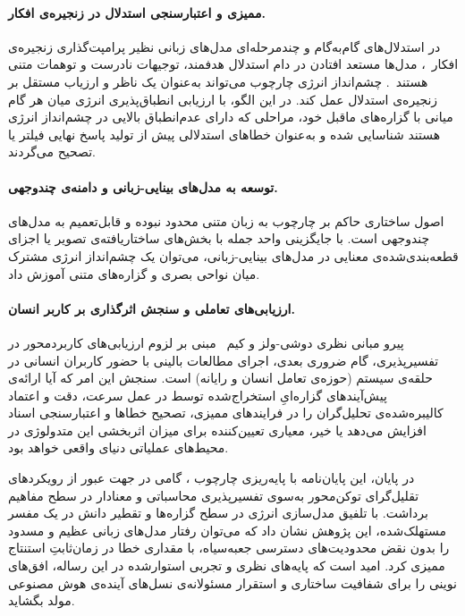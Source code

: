 \paragraph{ممیزی و اعتبارسنجی استدلال در زنجیره‌ی افکار.}
در استدلال‌های گام‌به‌گام و چندمرحله‌ای مدل‌های زبانی نظیر پرامپت‌گذاری زنجیره‌ی افکار~\cite{wei2022chain}، مدل‌ها مستعد افتادن در دام استدلال هدفمند، توجیهات نادرست و توهمات متنی هستند~\cite{turpin2023language}. چشم‌انداز انرژی چارچوب  می‌تواند به‌عنوان یک ناظر و ارزیاب مستقل بر زنجیره‌ی استدلال عمل کند. در این الگو، با ارزیابی انطباق‌پذیری انرژی میان هر گام میانی با گزاره‌های ماقبل خود، مراحلی که دارای عدم‌انطباق بالایی در چشم‌انداز انرژی هستند شناسایی شده و به‌عنوان خطاهای استدلالی پیش از تولید پاسخ نهایی فیلتر یا تصحیح می‌گردند.

\paragraph{توسعه به مدل‌های بینایی-زبانی و دامنه‌ی چندوجهی.}
اصول ساختاری حاکم بر چارچوب  به زبان متنی محدود نبوده و قابل‌تعمیم به مدل‌های چندوجهی است. با جایگزینی واحد جمله با بخش‌های ساختاریافته‌ی تصویر یا اجزای قطعه‌بندی‌شده‌ی معنایی در مدل‌های بینایی-زبانی، می‌توان یک چشم‌انداز انرژی مشترک میان نواحی بصری و گزاره‌های متنی آموزش داد.

\paragraph{ارزیابی‌های تعاملی و سنجش اثرگذاری بر کاربر انسان.}
پیرو مبانی نظری دوشی-ولز و کیم~\cite{doshivelez2017rigorous} مبنی بر لزوم ارزیابی‌های کاربردمحور در تفسیرپذیری، گام ضروری بعدی، اجرای مطالعات بالینی با حضور کاربران انسانی در حلقه‌ی سیستم (حوزه‌ی تعامل انسان و رایانه) است. سنجش این امر که آیا ارائه‌ی پیش‌آیندهای گزاره‌ایِ استخراج‌شده توسط  در عمل سرعت، دقت و اعتماد کالیبره‌شده‌ی تحلیل‌گران را در فرایندهای ممیزی، تصحیح خطاها و اعتبارسنجی اسناد افزایش می‌دهد یا خیر، معیاری تعیین‌کننده برای میزان اثربخشی این متدولوژی در محیط‌های عملیاتی دنیای واقعی خواهد بود.

\vspace{0.5cm}
در پایان، این پایان‌نامه با پایه‌ریزی چارچوب ، گامی در جهت عبور از رویکردهای تقلیل‌گرای توکن‌محور به‌سوی تفسیرپذیری محاسباتی و معنادار در سطح مفاهیم برداشت. با تلفیق مدل‌سازی انرژی در سطح گزاره‌ها و تقطیر دانش در یک مفسر مستهلک‌شده، این پژوهش نشان داد که می‌توان رفتار مدل‌های زبانی عظیم و مسدود را بدون نقض محدودیت‌های دسترسی جعبه‌سیاه، با مقداری خطا در زمان‌ثابتِ استنتاج ممیزی کرد. امید است که پایه‌های نظری و تجربی استوارشده در این رساله، افق‌های نوینی را برای شفافیت ساختاری و استقرار مسئولانه‌ی نسل‌های آینده‌ی هوش مصنوعی مولد بگشاید.